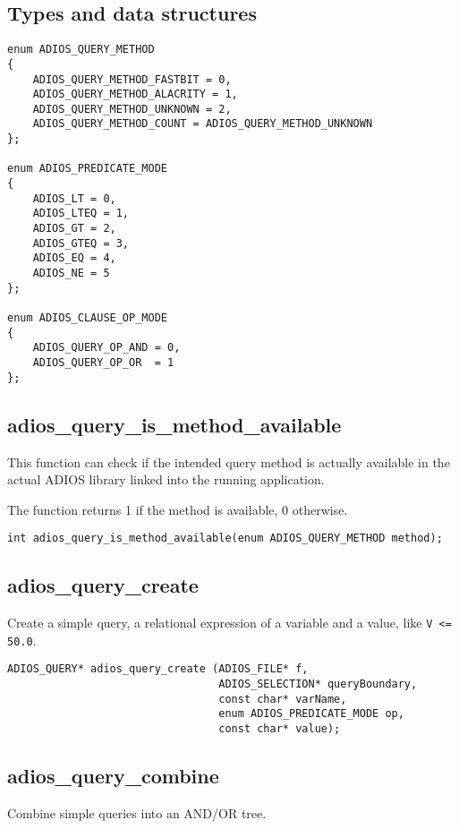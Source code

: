 \subsection{Types and data structures}
\begin{lstlisting}
enum ADIOS_QUERY_METHOD
{
    ADIOS_QUERY_METHOD_FASTBIT = 0,
    ADIOS_QUERY_METHOD_ALACRITY = 1,
    ADIOS_QUERY_METHOD_UNKNOWN = 2,
    ADIOS_QUERY_METHOD_COUNT = ADIOS_QUERY_METHOD_UNKNOWN
};

enum ADIOS_PREDICATE_MODE
{
    ADIOS_LT = 0,
    ADIOS_LTEQ = 1,
    ADIOS_GT = 2,
    ADIOS_GTEQ = 3,
    ADIOS_EQ = 4,
    ADIOS_NE = 5
};

enum ADIOS_CLAUSE_OP_MODE
{
    ADIOS_QUERY_OP_AND = 0,
    ADIOS_QUERY_OP_OR  = 1
};

\end{lstlisting}


\subsection{adios\_query\_is\_method\_available}
This function can check if the intended query method is actually available in the actual ADIOS library linked into the running application. 

\noindent The function returns 1 if the method is available, 0 otherwise.

\begin{lstlisting}[alsolanguage=C]
int adios_query_is_method_available(enum ADIOS_QUERY_METHOD method);
\end{lstlisting}

\subsection{adios\_query\_create}
Create a simple query, a relational expression of a variable and a value, like \verb+V <= 50.0+. 

\begin{lstlisting}[alsolanguage=C]
ADIOS_QUERY* adios_query_create (ADIOS_FILE* f,
                                 ADIOS_SELECTION* queryBoundary,
                                 const char* varName,
                                 enum ADIOS_PREDICATE_MODE op,
                                 const char* value);
\end{lstlisting}

\subsection{adios\_query\_combine}
Combine simple queries into an AND/OR tree. 

